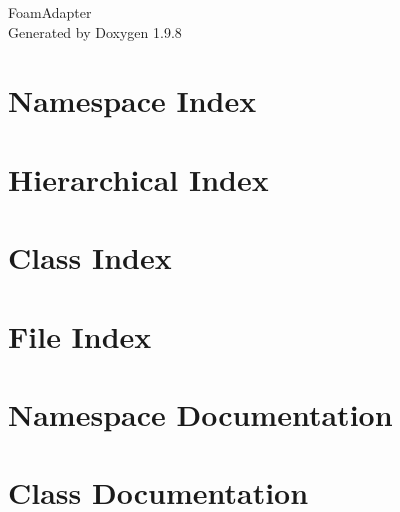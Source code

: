 \documentclass[twoside]{book}
\newcommand{\+}{\discretionary{\mbox{\scriptsize$\hookleftarrow$}}{}{}}
\newcommand{\clearemptydoublepage}{%
    \newpage{\pagestyle{empty}\cleardoublepage}%
  }
\begin{document}
  \raggedbottom
    \hypersetup{pageanchor=false,
                bookmarksnumbered=true,
                pdfencoding=unicode
               }
  \begin{titlepage}
  \vspace*{7cm}
  \begin{center}%
  {\Large Foam\+Adapter}\\
  \vspace*{1cm}
  {\large Generated by Doxygen 1.9.8}\\
  \end{center}
  \end{titlepage}
  \clearemptydoublepage
  \tableofcontents
  \clearemptydoublepage
  \hypersetup{pageanchor=true}
\chapter{Namespace Index}

\chapter{Hierarchical Index}

\chapter{Class Index}

\chapter{File Index}

\chapter{Namespace Documentation}


\chapter{Class Documentation}














\end{document}
